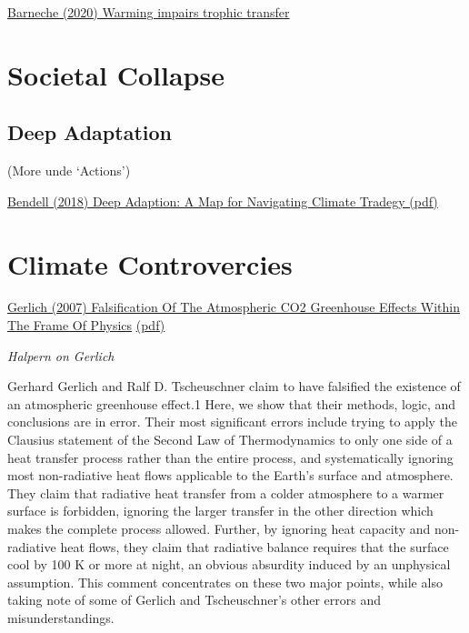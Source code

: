 \documentclass[
]{book}
\begin{document}
\href{https://www.nature.com/articles/s41586-021-03352-2.epdf?sharing_token=en8G_PplC0NZ0bhBexd-sNRgN0jAjWel9jnR3ZoTv0Ocz1xjDcPWe-XYsQ6aAwENGLYkqI0ZtDZNzNTVzQDqzZn-V1IKe1zVtdJyDa_OeTOMHVBxxTmAVAdf8C0XWZFeT5VbXvvLwC4vezF-pqJafKF8PZc0_EjTPOG1MccecjM\%3D}{Barneche (2020) Warming impairs trophic transfer}

\hypertarget{societal-collapse}{%
\chapter{Societal Collapse}\label{societal-collapse}}

\hypertarget{deep-adaptation}{%
\section{Deep Adaptation}\label{deep-adaptation}}

(More unde `Actions')

\href{pdf/\%20Bendell_2020_Deep_Adaptation.pdf}{Bendell (2018) Deep Adaption: A Map for Navigating Climate Tradegy (pdf)}

\hypertarget{climate-controvercies}{%
\chapter{Climate Controvercies}\label{climate-controvercies}}

\href{https://arxiv.org/abs/0707.1161v3}{Gerlich (2007) Falsification Of The Atmospheric CO2 Greenhouse Effects Within The Frame Of Physics}
\href{pdf/Gerlich_2007_Falsification_Greenhouse.pdf}{(pdf)}

\emph{Halpern on Gerlich}

Gerhard Gerlich and Ralf D. Tscheuschner claim to have falsified the existence of an atmospheric greenhouse effect.1 Here, we show that their methods, logic, and conclusions are in error. Their most significant errors include trying to apply the Clausius statement of the Second Law of Thermodynamics to only one side of a heat transfer process rather than the entire process, and systematically ignoring most non-radiative heat flows applicable to the Earth's surface and atmosphere. They claim that radiative heat transfer from a colder atmosphere to a warmer surface is forbidden, ignoring the larger transfer in the other direction which makes the complete process allowed. Further, by ignoring heat capacity and non-radiative heat flows, they claim that radiative balance requires that the surface cool by 100 K or more at night, an obvious absurdity induced by an unphysical assumption. This comment concentrates on these two major points, while also taking note of some of Gerlich and Tscheuschner's other errors and misunderstandings.
\end{document}
